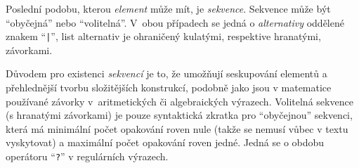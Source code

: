 Poslední podobu, kterou \emph{element} může mít, je \emph{sekvence}.
Sekvence může být \enquote{obyčejná} nebo \enquote{volitelná}.
V~obou případech se jedná o \emph{alternativy} oddělené znakem \enquote{\texttt{|}},
list alternativ je ohraničený kulatými, respektive hranatými, závorkami.

Důvodem pro existenci \emph{sekvencí} je to, že umožňují seskupování elementů a přehlednější tvorbu složitějších konstrukcí,
podobně jako jsou v matematice používané závorky v~aritmetických či algebraických výrazech.
Volitelná sekvence (s hranatými závorkami) je pouze syntaktická zkratka pro \enquote{obyčejnou} sekvenci,
která má minimální počet opakování roven nule (takže se nemusí vůbec v textu vyskytovat) a
maximální počet opakování roven jedné.
Jedná se o obdobu operátoru \enquote{\texttt{?}} v regulárních výrazech.

